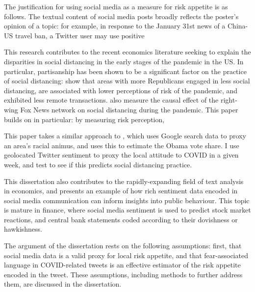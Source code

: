\documentclass{article}
\begin{document}
The justification for using social media as a measure for risk appetite is as follows. The textual content of social media posts broadly reflects the poster's opinion of a topic: for example, in response to the January 31st news of a China-US travel ban, a Twitter user may use positive

This research contributes to the recent economics literature seeking to explain the disparities in social distancing in the early stages of the pandemic in the US. In particular, partisanship has been shown to be a significant factor on the practice of social distancing: \textcite{allcottPolarizationPublicHealth2020,barriosRiskPerceptionLens2020,painterPoliticalBeliefsAffect2020} show that areas with more Republicans engaged in less social distancing, are associated with lower perceptions of risk of the pandemic, and exhibited less remote transactions. \textcite{simonovPersuasiveEffectFox2020,ananyevSafestTimeFly2020} also measure the causal effect of the right-wing Fox News network on social distancing during the pandemic. This paper builds on \textcite{barriosRiskPerceptionLens2020} in particular: by measuring risk perception, 

This paper takes a similar approach to \textcite{stephens-davidowitzCostRacialAnimus2014}, which uses Google search data to proxy an area's racial animus, and uses this to estimate the Obama vote share. I use geolocated Twitter sentiment to proxy the local attitude to COVID in a given week, and test to see if this predicts social distancing practice. 


This dissertation also contributes to the rapidly-expanding field of text analysis in economics, and presents an example of how rich sentiment data encoded in social media communication can inform insights into public behaviour. This topic is mature in finance, where social media sentiment is used to predict stock market reactions, and central bank statements coded according to their dovishness or hawkishness. 

The argument of the dissertation rests on the following assumptions: first, that social media data is a valid proxy for local risk appetite, and that fear-associated language in COVID-related tweets is an effective estimator of the risk appetite encoded in the tweet. These assumptions, including methods to further address them, are discussed in the dissertation.
\end{document}
